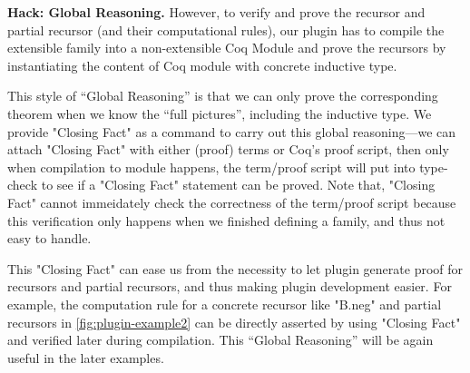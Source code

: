 
\textbf{Hack: Global Reasoning.}
However, to verify and prove the recursor and partial recursor (and their computational rules), our plugin has to compile the extensible family into a non-extensible Coq Module and prove the recursors by instantiating the content of Coq module with concrete inductive type.  

This style of ``Global Reasoning'' is that we can only prove the corresponding theorem when we know the ``full pictures'', including the inductive type. We provide "Closing Fact" as a command to carry out this global reasoning---we can attach "Closing Fact" with either (proof) terms or Coq's proof script, then only when compilation to module happens, the term/proof script will put into type-check to see if a "Closing Fact" statement can be proved. Note that, "Closing Fact" cannot immeidately check the correctness of the term/proof script because this verification only happens when we finished defining a family, and thus not easy to handle.

This "Closing Fact" can ease us from the necessity to let plugin generate proof for recursors and partial recursors, and thus making plugin development easier. For example, the computation rule for a concrete recursor like "B.neg" and partial recursors in \cref{fig:plugin-example2} can be directly asserted by using "Closing Fact" and verified later during compilation. This ``Global Reasoning'' will be again useful in the later examples.

